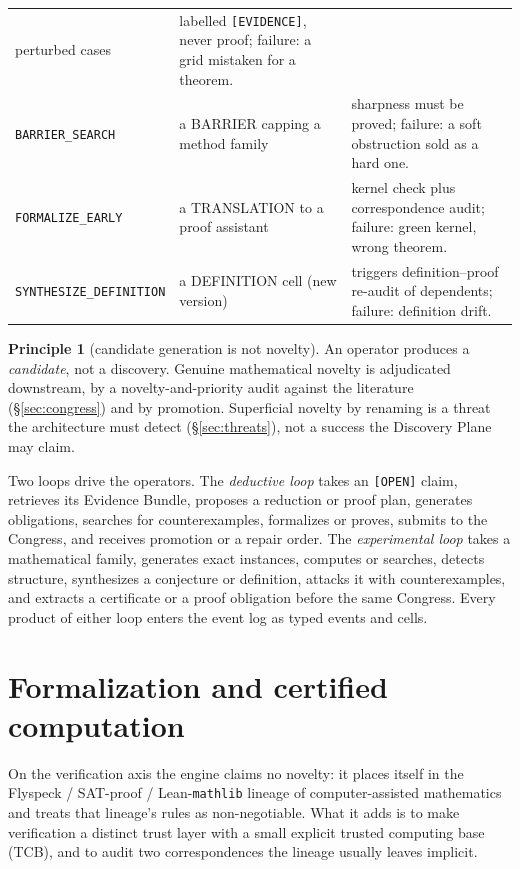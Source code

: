 \documentclass[11pt]{amsart}
\theoremstyle{definition}
\newtheorem{principle}{Principle}
\theoremstyle{remark}
\newcommand{\state}[1]{\texttt{[#1]}}
\newcommand{\otype}[1]{\textsc{#1}}
\newcommand{\op}[1]{\texttt{#1}}
\begin{document}
{\begin{longtable}{@{}p{}p{}p{}@{}}
perturbed cases & labelled \state{EVIDENCE}, never proof; failure: a grid
mistaken for a theorem.\\
\op{BARRIER\_SEARCH} & a \otype{BARRIER} capping a method family & sharpness must
be proved; failure: a soft obstruction sold as a hard one.\\
\op{FORMALIZE\_EARLY} & a \otype{TRANSLATION} to a proof assistant & kernel check
plus correspondence audit; failure: green kernel, wrong theorem.\\
\op{SYNTHESIZE\_DEFINITION} & a \otype{DEFINITION} cell (new version) & triggers
definition--proof re-audit of dependents; failure: definition drift.\\
\bottomrule
\end{longtable}
}

\begin{principle}[candidate generation is not novelty]\label{pr:novelty}
An operator produces a \emph{candidate}, not a discovery. Genuine mathematical
novelty is adjudicated downstream, by a novelty-and-priority audit against the
literature (\S\ref{sec:congress}) and by promotion. Superficial novelty by
renaming is a threat the architecture must detect (\S\ref{sec:threats}), not a
success the Discovery Plane may claim.
\end{principle}

Two loops drive the operators. The \emph{deductive loop} takes an \state{OPEN}
claim, retrieves its Evidence Bundle, proposes a reduction or proof plan,
generates obligations, searches for counterexamples, formalizes or proves,
submits to the Congress, and receives promotion or a repair order. The
\emph{experimental loop} takes a mathematical family, generates exact instances,
computes or searches, detects structure, synthesizes a conjecture or definition,
attacks it with counterexamples, and extracts a certificate or a proof
obligation before the same Congress. Every product of either loop enters the
event log as typed events and cells.

\section{Formalization and certified computation}\label{sec:formal}

On the verification axis the engine claims no novelty: it places itself in the
Flyspeck / SAT-proof / Lean-\texttt{mathlib} lineage of computer-assisted
mathematics~\cite{Hales17,Heule16,Gonthier08,mathlib20} and treats that
lineage's rules as non-negotiable. What it adds is to make verification a
distinct trust layer with a small explicit trusted computing base (TCB), and to
audit two correspondences the lineage usually leaves implicit.
\end{document}
